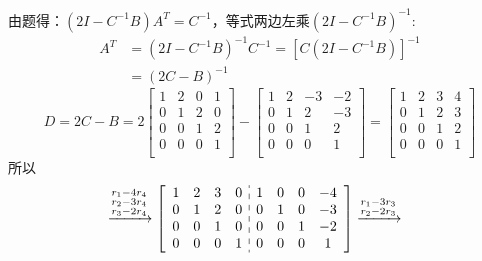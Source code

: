 \documentclass{article}
\begin{document}
\begin{jie}
由题得：$(2I-C^{-1}B)A^{T}=C^{-1}$，等式两边左乘$(2I-C^{-1}B)^{-1}$:
\begin{align*}
A^{T}&=(2I-C^{-1}B)^{-1}C^{-1}=[C(2I-C^{-1}B)]^{-1}\\
&=(2C-B)^{-1}
\end{align*}
\begin{equation*}
D=2C-B=2\begin{bmatrix}
  1 & 2 & 0 & 1\\
  0 & 1 & 2 & 0\\
  0 & 0 & 1 & 2\\
  0 & 0 & 0 & 1\\
\end{bmatrix}-\begin{bmatrix}
  1 & 2 & -3 & -2\\
  0 & 1 & 2 & -3\\
  0 & 0 & 1 & 2\\
  0 & 0 & 0 & 1\\
\end{bmatrix}=
\begin{bmatrix}
  1 & 2 & 3 & 4\\
  0 & 1 & 2 & 3\\
  0 & 0 & 1 & 2\\
  0 & 0 & 0 & 1\\
\end{bmatrix}
\end{equation*}
所以
\begin{align*}
[D|E_{4}]&\xrightarrow{\substack{r_{1}-4r_{4}\\ r_{2}-3r_{4}\\ r_{3}-2r_{4}}}
{\left[
\begin{array}{c:c}
\begin{matrix}
  1 & 2 & 3 & 0\\
  0 & 1 & 2 & 0\\
  0 & 0 & 1 & 0\\
  0 & 0 & 0 & 1\\
\end{matrix} &
\begin{matrix}
  1 & 0 & 0 & -4\\
  0 & 1 & 0 & -3\\
  0 & 0 & 1 & -2\\
  0 & 0 & 0 & 1\\
\end{matrix}
\end{array}
\right]
}\xrightarrow{\substack{r_{1}-3r_{3}\\ r_{2}-2r_{3}}}

\end{align*}
\end{jie}
\end{document}
